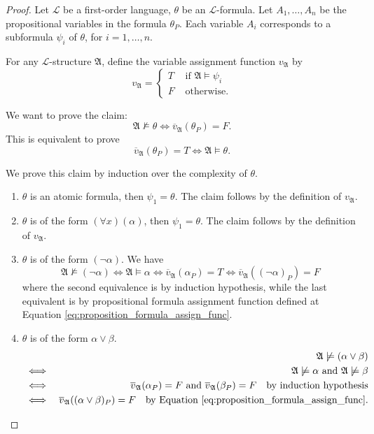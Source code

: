 \documentclass[11pt,letterpaper]{book}
\theoremstyle{definition}
\begin{document}
\begin{proof}
Let $\mathcal{L}$ be a first-order language, $\theta$ be an
$\mathcal{L}$-formula. Let $A_1, \ldots, A_n$ be the propositional
variables in the formula $\theta_P$. Each variable $A_i$ corresponds to
a subformula $\psi_i$ of $\theta$, for $i=1,\ldots,n$.

For any $\mathcal{L}$-structure $\mathfrak{A}$, define the variable
assignment function $v_{\mathfrak{A}}$ by
\begin{equation}
v_{\mathfrak{A}} =
\begin{cases}\nonumber
T & \text{ if } \mathfrak{A } \models \psi_i \\
F & \text{ otherwise}.
\end{cases}
\end{equation}

We want to prove the claim:
$$ \mathfrak{A} \not \models \theta \iff \overline{v}_{\mathfrak{A}}
(\theta_P) = F .$$
This is equivalent to prove
$$  \overline{v}_{\mathfrak{A}} (\theta_P) = T  \iff \mathfrak{A}
\models \theta .$$

We prove this claim by induction over the complexity of $\theta$.
\begin{enumerate}
\item{$\theta$ is an atomic formula, then $\psi_1 = \theta$. The claim
follows by the definition of $v_{\mathfrak{A}}$.}
\item{$\theta$ is of the form $(\forall x ) (\alpha) $, then $\psi_1 =
\theta$. The claim follows by the definition of $v_{\mathfrak{A}}$.}
\item{$\theta$ is of the form $(\lnot \alpha)$. We have
$$ \mathfrak{A}\not \models (\lnot \alpha)\iff \mathfrak{A}\models
\alpha \iff \overline{v}_{\mathfrak{A}}(\alpha_P)  = T \iff
\overline{v}_{\mathfrak{A}} ( (\lnot \alpha)_P ) = F$$
where the second equivalence is by induction hypothesis, while the last
equivalent is by propositional formula assignment function defined at
Equation \ref{eq:proposition_formula_assign_func}.
}
\item{$\theta$ is of the form $\alpha \lor \beta$.
\begin{eqnarray*}
& & \mathfrak{A} \not \models (\alpha \lor \beta) \\
& \iff & \mathfrak{A} \not
\models \alpha \text{ and } \mathfrak{A} \not \models \beta \\
& \iff &  \overline{v}_{\mathfrak{A}}(\alpha_P)  = F \text{ and }
\overline{v}_{\mathfrak{A}}(\beta_P)  = F \quad \text{by induction
hypothesis} \\
& \iff &  \overline{v}_{\mathfrak{A}}((\alpha \lor \beta )_P)  = F \quad
\text{by Equation \ref{eq:proposition_formula_assign_func}}.
\end{eqnarray*}

}
\end{enumerate}
\end{proof}
\end{document}
